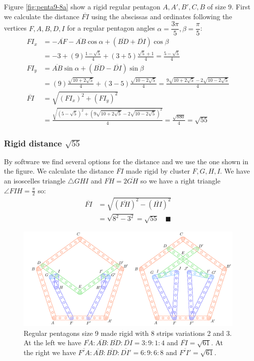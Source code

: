 \documentclass[11pt]{article}
\begin{document}
Figure \ref{fig:penta9-8a} show a rigid regular pentagon $A,A',B',C,B$ of size $9$. First we calculate the distance $\overline{FI}$ using the abscissas and ordinates following the vertices $F,A,B,D,I$ for a regular pentagon angles $\alpha=\dfrac{3\pi}5, \beta=\dfrac{\pi}5$:
\begin{align}
FI_x &= -\overline{AF} - \overline{AB}\cos\alpha + (\overline{BD} + \overline{DI})\cos\beta\nonumber\\
 &= -3 + (9)\frac{1-\sqrt5}4 + (3+5)\frac{\sqrt5+1}4 = \frac{5-\sqrt5}4\\
FI_y &= \overline{AB}\sin\alpha + (\overline{BD}-\overline{DI})\sin\beta\nonumber\\
 &= (9)\frac{\sqrt{10+2\sqrt5}}4 + (3-5)\frac{\sqrt{10-2\sqrt5}}4
 = \frac{9\sqrt{10+2\sqrt5} - 2\sqrt{10-2\sqrt5}}4\\
\overline{FI} &= \sqrt{(FI_x)^2 + (FI_y)^2}\nonumber\\
 &= \frac{\sqrt{(5-\sqrt5)^2 + (9\sqrt{10+2\sqrt5} - 2\sqrt{10-2\sqrt5})^2}}4
 = \frac{\sqrt{880}}4 = \sqrt{55}
\end{align}

\subsubsection{Rigid distance $\sqrt{55}$}

By software we find several options for the distance and we use the one shown in the figure.
We calculate the distance $\overline{FI}$ made rigid by cluster $F,G,H,I$. We have an isoscelles triangle $\triangle{GHI}$ and $\overline{FH}=2\overline{GH}$ so we have a right triangle $\angle{FIH}=\frac{\pi}2$ so: \begin{align}
\overline{FI} &= \sqrt{(\overline{FH})^2 - (\overline{HI})^2}\nonumber\\
 &= \sqrt{8^2 - 3^2} = \sqrt{55} \quad\blacksquare
\end{align}

\begin{figure}[H]
 \centering
 \includegraphics[scale=0.95]{9/penta9-8b}
 \caption{Regular pentagons size 9 made rigid with 8 strips variations 2 and 3. At the left we have $\overline{FA}:\overline{AB}:\overline{BD}:\overline{DI} = 3:9:1:4$ and $\overline{FI} = \sqrt{61}$. At the right we have $\overline{F'A}:\overline{AB}:\overline{BD}:\overline{DI'} = 6:9:6:8$ and $\overline{F'I'}=\sqrt{61}$.}
 \label{fig:penta9-8b}
\end{figure}
\end{document}
